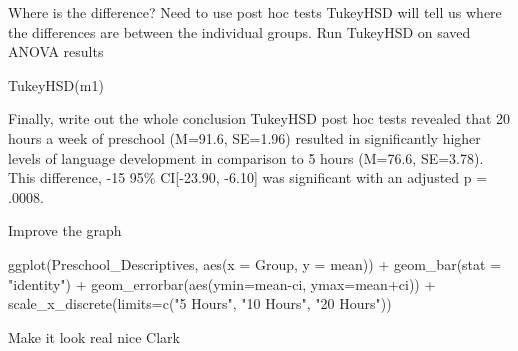 \documentclass[
]{book}
\newenvironment{Shaded}{\begin{snugshade}}{\end{snugshade}}
\newcommand{\AttributeTok}[1]{\textcolor[rgb]{0.77,0.63,0.00}{#1}}
\newcommand{\FunctionTok}[1]{\textcolor[rgb]{0.00,0.00,0.00}{#1}}
\newcommand{\NormalTok}[1]{#1}
\newcommand{\SpecialCharTok}[1]{\textcolor[rgb]{0.00,0.00,0.00}{#1}}
\newcommand{\StringTok}[1]{\textcolor[rgb]{0.31,0.60,0.02}{#1}}
\begin{document}
Where is the difference? Need to use post hoc tests
TukeyHSD will tell us where the differences are between the individual groups. Run TukeyHSD on saved ANOVA results

\begin{Shaded}
\begin{Highlighting}[]
\FunctionTok{TukeyHSD}\NormalTok{(m1)}
\end{Highlighting}
\end{Shaded}

Finally, write out the whole conclusion
TukeyHSD post hoc tests revealed that 20 hours a week of preschool (M=91.6, SE=1.96) resulted in significantly higher levels of language development in comparison to 5 hours (M=76.6, SE=3.78). This difference, -15 95\% CI{[}-23.90, -6.10{]} was significant with an adjusted p = .0008.

Improve the graph

\begin{Shaded}
\begin{Highlighting}[]
\FunctionTok{ggplot}\NormalTok{(Preschool\_Descriptives, }
       \FunctionTok{aes}\NormalTok{(}\AttributeTok{x =}\NormalTok{ Group, }
           \AttributeTok{y =}\NormalTok{ mean)) }\SpecialCharTok{+}
  \FunctionTok{geom\_bar}\NormalTok{(}\AttributeTok{stat =} \StringTok{"identity"}\NormalTok{) }\SpecialCharTok{+}
  \FunctionTok{geom\_errorbar}\NormalTok{(}\FunctionTok{aes}\NormalTok{(}\AttributeTok{ymin=}\NormalTok{mean}\SpecialCharTok{{-}}\NormalTok{ci,}
                    \AttributeTok{ymax=}\NormalTok{mean}\SpecialCharTok{+}\NormalTok{ci)) }\SpecialCharTok{+}
  \FunctionTok{scale\_x\_discrete}\NormalTok{(}\AttributeTok{limits=}\FunctionTok{c}\NormalTok{(}\StringTok{"5 Hours"}\NormalTok{, }\StringTok{"10 Hours"}\NormalTok{, }\StringTok{"20 Hours"}\NormalTok{))}
\end{Highlighting}
\end{Shaded}

Make it look real nice Clark
\end{document}
